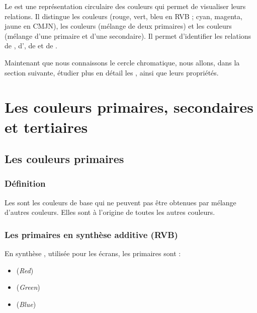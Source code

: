 \begin{retenir}
Le  est une représentation circulaire des couleurs qui permet de visualiser leurs relations. Il distingue les couleurs  (rouge, vert, bleu en RVB ; cyan, magenta, jaune en CMJN), les couleurs  (mélange de deux primaires) et les couleurs  (mélange d'une primaire et d'une secondaire). Il permet d'identifier les relations de , d', de  et de .
\end{retenir}

Maintenant que nous connaissons le cercle chromatique, nous allons, dans la section suivante, étudier plus en détail les , ainsi que leurs propriétés.

\section{Les couleurs primaires, secondaires et tertiaires}

\subsection{Les couleurs primaires}

\subsubsection{Définition}

Les  sont les couleurs de base qui ne peuvent pas être obtenues par mélange d'autres couleurs. Elles sont à l'origine de toutes les autres couleurs.

\subsubsection{Les primaires en synthèse additive (RVB)}

En synthèse , utilisée pour les écrans, les primaires sont :

\begin{itemize}
    \item {} (\emph{Red})
    \item {} (\emph{Green})
    \item {} (\emph{Blue})
\end{itemize}


